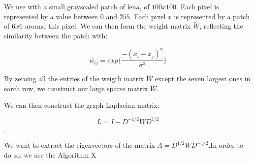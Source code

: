 \documentclass[onecolumn,12pt]{article}
\begin{document}
We use with a small grayscaled patch of lena, of $100 x 100$. Each pixel is
represented by a value between $0$ and $255$. Each pixel $x$ is represented by
a patch of $6x6$ around this pixel. We can then form the weight matrix
$\tilde{W}$, reflecting the similarity between the patch with:

$$\tilde{w_{ij}} = exp \{ \frac{- (x_i - x_j)^2}{\sigma^2}\}$$

By zeroing all the entries of the weigth matrix $\tilde{W}$ except the seven
largest ones in earch row, we construct our large sparse matrix $W$.

We can then construct the graph Laplacian matrix:

$$L = I - D^{-1/2} W D^{1/2}$$.

We want to extract the eigenvectors of the matrix $A= D^{1/2} W D^{-1/2}$.In
order to do so, we use the Algorithm X


\end{document}
